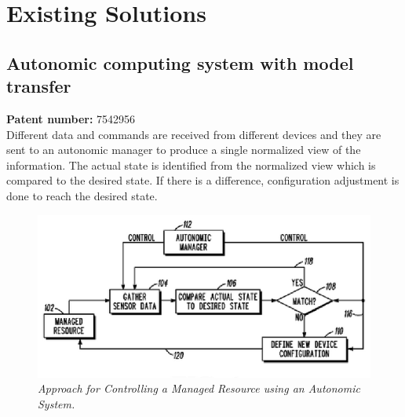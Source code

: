 \chapter{Existing Solutions}
\section{Autonomic computing system with model transfer}
\textbf{Patent number:} 7542956\cite{STRASSNER:2009}\\
Different data and commands are received from different devices and they are sent to an autonomic manager to produce a single normalized view of the information. The actual state is identified from the normalized view which is compared to the desired state. If there is a difference, configuration adjustment is done to reach the desired state.
	\begin{figure}[h]
		\begin{center}
			\includegraphics{figures/patent1_1.eps} 
			\caption{\small \sl Approach for Controlling a Managed Resource using an Autonomic System.\label{fig:Label1}} 
		\end{center} 
	\end{figure}

